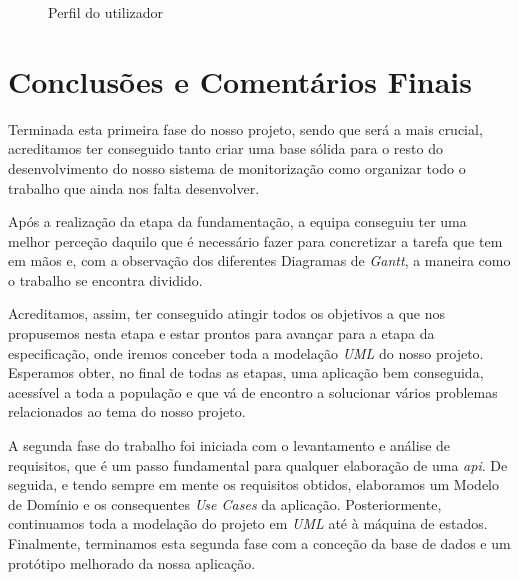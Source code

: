 \documentclass[a4paper,12pt]{scrreprt}
\newcommand{\tab}{
    \hspace{1cm}}
\begin{document}
\begin{figure}[H]
    \centering
    \caption{Perfil do utilizador}
\end{figure}


\clearpage

\chapter{Conclusões e Comentários Finais}
\tab Terminada esta primeira fase do nosso projeto, sendo que será a mais crucial, acreditamos ter conseguido tanto criar uma base sólida para o resto do desenvolvimento do nosso sistema de monitorização como organizar todo o trabalho que ainda nos falta desenvolver.
    
\tab Após a realização da etapa da fundamentação, a equipa conseguiu ter uma melhor perceção daquilo que é necessário fazer para concretizar a tarefa que tem em mãos e, com a observação dos diferentes Diagramas de \textit{Gantt}, a maneira como o trabalho se encontra dividido.
    
\tab Acreditamos, assim, ter conseguido atingir todos os objetivos a que nos propusemos nesta etapa e estar prontos para avançar para a etapa da especificação, onde iremos conceber toda a modelação \textit{UML} do nosso projeto. Esperamos obter, no final de todas as etapas, uma aplicação bem conseguida, acessível a toda a população e que vá de encontro a solucionar vários problemas relacionados ao tema do nosso projeto.

\vspace{0.5cm}
\tab A segunda fase do trabalho foi iniciada com o levantamento e análise de requisitos, que é um passo fundamental para qualquer elaboração de uma \textit{api}. De seguida, e tendo sempre em mente os requisitos obtidos, elaboramos um Modelo de Domínio e os consequentes \textit{Use Cases} da aplicação. Posteriormente, continuamos toda a modelação do projeto em \textit{UML} até à máquina de estados. Finalmente, terminamos esta segunda fase com a conceção da base de dados e um protótipo melhorado da nossa aplicação.
\end{document}
